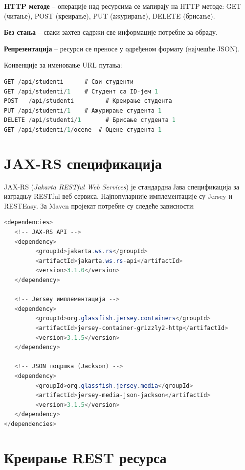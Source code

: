 \textbf{HTTP методе} – операције над ресурсима се мапирају на HTTP методе: GET (читање), POST (креирање), PUT (ажурирање), DELETE (брисање).

\textbf{Без стања} – сваки захтев садржи све информације потребне за обраду.

\textbf{Репрезентација} – ресурси се преносе у одређеном формату (најчешће JSON).

Конвенције за именовање URL путања:


\begin{lstlisting}[language=Java]
GET /api/studenti      # Сви студенти
GET /api/studenti/1    # Студент са ID-јем 1
POST   /api/studenti         # Креирање студента
PUT /api/studenti/1    # Ажурирање студента 1
DELETE /api/studenti/1       # Брисање студента 1
GET /api/studenti/1/ocene  # Оцене студента 1
\end{lstlisting}


\section{JAX-RS спецификација}

JAX-RS (\textit{Jakarta RESTful Web Services}) је стандардна Јава спецификација за изградњу RESTful веб сервиса. Најпопуларније имплементације су Jersey и RESTEasy. За Maven пројекат потребне су следеће зависности:


\begin{lstlisting}[language=Java]
<dependencies>
   <!-- JAX-RS API -->
   <dependency>
         <groupId>jakarta.ws.rs</groupId>
         <artifactId>jakarta.ws.rs-api</artifactId>
         <version>3.1.0</version>
   </dependency>
 
   <!-- Jersey имплементација -->
   <dependency>
         <groupId>org.glassfish.jersey.containers</groupId>
         <artifactId>jersey-container-grizzly2-http</artifactId>
         <version>3.1.5</version>
   </dependency>
 
   <!-- JSON подршка (Jackson) -->
   <dependency>
         <groupId>org.glassfish.jersey.media</groupId>
         <artifactId>jersey-media-json-jackson</artifactId>
         <version>3.1.5</version>
   </dependency>
</dependencies>
\end{lstlisting}


\section{Креирање REST ресурса}

